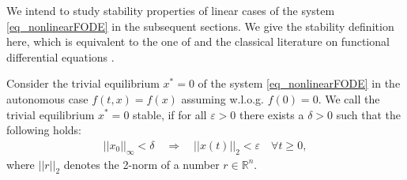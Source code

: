 \documentclass{svproc}
\newcommand{\realnumbers}{\mathbb{R}}
\newcommand{\CderivativeInput}[2]{{}^\mathrm{C}\operatorname{D}_{#2}^{#1}}
\begin{document}
We intend to study stability properties of linear cases of the system \eqref{eq_nonlinearFODE} in the subsequent sections. We give the stability definition here, which is equivalent to the one of \cite{Hinze2020} and the classical literature on functional differential equations \cite{Hale1977}.
\begin{definition}\label{def_stability}
	Consider the trivial equilibrium $x^\ast = 0$ of the system \eqref{eq_nonlinearFODE} in the autonomous case $f(t,x)=f(x)$ assuming w.l.o.g. $f(0) = 0$.
	 We call the trivial equilibrium $x^\ast = 0$ stable, if for all $\varepsilon>0$ there exists a $\delta >0$ such that the following holds:
	\begin{align}
		||x_0||_\infty <\delta\quad \Longrightarrow \quad ||x(t)||_2<\varepsilon \quad \forall t\geq 0,
	\end{align}
    {where $||r||_2$ denotes the 2-norm of a number $r\in \realnumbers^n$.}
\end{definition}
\end{document}
